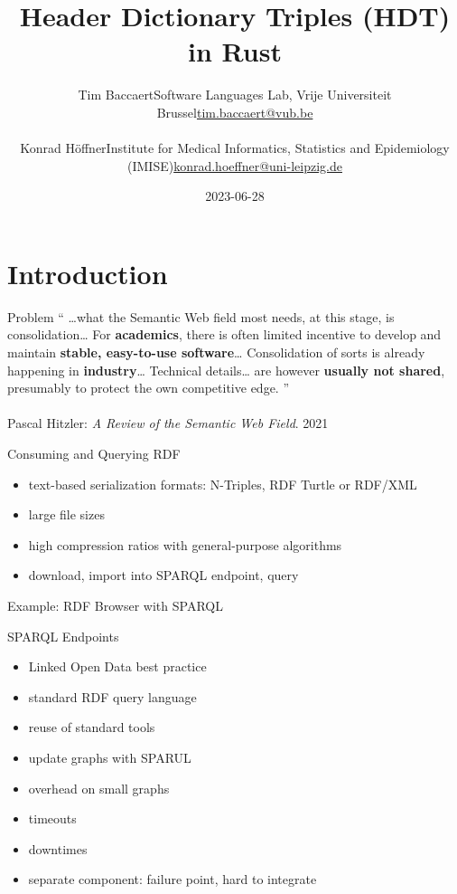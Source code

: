 \documentclass[14pt,aspectratio=169]{beamer}
\date{2023-06-28}
\author{
\small
\texorpdfstring{Tim Baccaert\newline{}Software Languages Lab, Vrije Universiteit Brussel\newline{}\url{tim.baccaert@vub.be}}{Tim Baccaert}\\~\\
\texorpdfstring{Konrad Höffner\newline{}Institute for Medical Informatics, Statistics and Epidemiology (IMISE)\newline{}\url{konrad.hoeffner@uni-leipzig.de}}{Konrad Höffner}
}
\title{Header Dictionary Triples (HDT) in Rust}
\subtitle{}
\newcommand{\imageslide}[4][]
{
\begin{frame}[plain]{~~~~#2}
\vspace{0.2em}
\centering\makebox[\linewidth]{\texttt{[image: \#3]}}
\\#1
\note{#4}
\end{frame}
}
\newcommand\pro{\item[$+$]}
\newcommand\con{\item[$-$]}
\begin{document}
\begin{frame}
\titlepage
\end{frame}

\section{Introduction}

\begin{frame}{Problem}
\enquote{
\ldots{}what the Semantic Web field most needs, at this stage, is consolidation\ldots
For \textbf{academics}, there is often limited incentive to develop and maintain \textbf{stable, easy-to-use software}\ldots
Consolidation of sorts is already happening in \textbf{industry}\ldots
Technical details\ldots{} are however \textbf{usually not shared}, presumably to protect the own competitive edge.
}
\\~\\
Pascal Hitzler: \emph{A Review of the Semantic Web Field}. 2021
\end{frame}

\begin{frame}{Consuming and Querying RDF}
\begin{itemize}
\item text-based serialization formats: N-Triples, RDF Turtle or RDF/XML
\item large file sizes
\item high compression ratios with general-purpose algorithms
\item download, import into SPARQL endpoint, query
\end{itemize}
\end{frame}

\begin{frame}{Example: RDF Browser with SPARQL}
\end{frame}

\begin{frame}{SPARQL Endpoints}
\begin{itemize}
\pro Linked Open Data best practice
\pro standard RDF query language
\pro reuse of standard tools
\pro update graphs with SPARUL
\pause
\con overhead on small graphs
\con timeouts
\con downtimes
\con separate component: failure point, hard to integrate
\end{itemize}
\end{frame}
\end{document}
